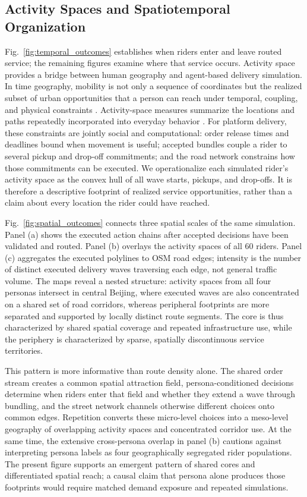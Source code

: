\documentclass[letterpaper,journal]{IEEEtran}
\begin{document}
\subsection{Activity Spaces and Spatiotemporal Organization}
Fig.~\ref{fig:temporal_outcomes} establishes when riders enter and leave routed service; the remaining figures examine where that service occurs. Activity space provides a bridge between human geography and agent-based delivery simulation. In time geography, mobility is not only a sequence of coordinates but the realized subset of urban opportunities that a person can reach under temporal, coupling, and physical constraints \cite{hagerstrandWhatPeopleRegional1970,millerMeasurementTheoryTime2005}. Activity-space measures summarize the locations and paths repeatedly incorporated into everyday behavior \cite{schonfelderActivitySpacesMeasures2003}. For platform delivery, these constraints are jointly social and computational: order release times and deadlines bound when movement is useful; accepted bundles couple a rider to several pickup and drop-off commitments; and the road network constrains how those commitments can be executed. We operationalize each simulated rider's activity space as the convex hull of all wave starts, pickups, and drop-offs. It is therefore a descriptive footprint of realized service opportunities, rather than a claim about every location the rider could have reached.

Fig.~\ref{fig:spatial_outcomes} connects three spatial scales of the same simulation. Panel (a) shows the executed action chains after accepted decisions have been validated and routed. Panel (b) overlays the activity spaces of all 60 riders. Panel (c) aggregates the executed polylines to OSM road edges; intensity is the number of distinct executed delivery waves traversing each edge, not general traffic volume. The maps reveal a nested structure: activity spaces from all four personas intersect in central Beijing, where executed waves are also concentrated on a shared set of road corridors, whereas peripheral footprints are more separated and supported by locally distinct route segments. The core is thus characterized by shared spatial coverage and repeated infrastructure use, while the periphery is characterized by sparse, spatially discontinuous service territories.

This pattern is more informative than route density alone. The shared order stream creates a common spatial attraction field, persona-conditioned decisions determine when riders enter that field and whether they extend a wave through bundling, and the street network channels otherwise different choices onto common edges. Repetition converts these micro-level choices into a meso-level geography of overlapping activity spaces and concentrated corridor use. At the same time, the extensive cross-persona overlap in panel (b) cautions against interpreting persona labels as four geographically segregated rider populations. The present figure supports an emergent pattern of shared cores and differentiated spatial reach; a causal claim that persona alone produces those footprints would require matched demand exposure and repeated simulations.
\end{document}
